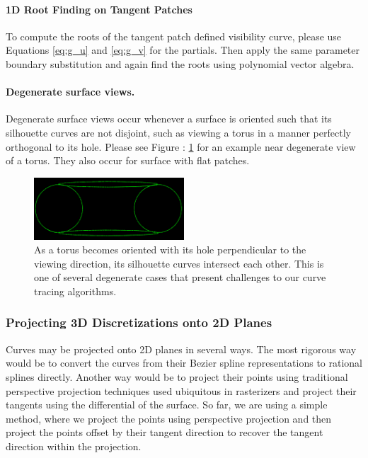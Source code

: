 \documentclass[12pt, letterpaper]{article}
\begin{document}
		\paragraph{1D Root Finding on Tangent Patches}

		To compute the roots of the tangent patch defined visibility curve, please use Equations \ref{eq:g_u} and \ref{eq:g_v} for the partials.
		Then apply the same parameter boundary substitution and again find the roots using polynomial vector algebra.

		\paragraph{Degenerate surface views.}

		Degenerate surface views occur whenever a surface is oriented such that its silhouette curves are not disjoint, such as viewing a torus in a manner perfectly orthogonal to its hole.
		Please see Figure : \ref{fig:degenerate_torus_orientation} for an example near degenerate view of a torus. They also occur for surface with flat patches.

		\begin{figure}[h]
		\centering
		\includegraphics[width=0.5\textwidth]{torus_side_silhouettes}
		\caption{As a torus becomes oriented with its hole perpendicular to the viewing direction, its silhouette curves intersect each other. 
			This is one of several degenerate cases that present challenges to our curve tracing algorithms.}
		\label{fig:degenerate_torus_orientation}
		\end{figure}

		\subsubsection{Projecting 3D Discretizations onto 2D Planes}

		Curves may be projected onto 2D planes in several ways. The most rigorous way would be to convert
		the curves from their Bezier spline representations to rational splines directly. Another way would be to project their points
		using traditional perspective projection techniques used ubiquitous in rasterizers and project their tangents using the differential of the surface.
		So far, we are using a simple method, where we project the points using perspective projection and then project the points offset by their tangent direction
		to recover the tangent direction within the projection.
\end{document}
